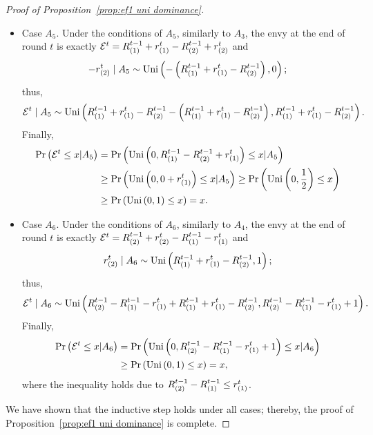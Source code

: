 \begin{proof}[Proof of Proposition~\ref{prop:ef1 uni dominance}]
\begin{itemize}
    \item Case $A_5$.
    Under the conditions of $A_5$, similarly to $A_3$, the envy at the end of round $t$ is exactly $\mathcal{E}^t = R^{t-1}_{(1)} + r_{(1)}^t - R^{t-1}_{(2)} + r_{(2)}^t$ and
    \[
    - r_{(2)}^t \mid A_5 \sim \text{Uni}\left(-\left(R^{t-1}_{(1)} + r_{(1)}^t - R^{t-1}_{(2)}\right), 0\right);
    \]
    thus,
    \[
    \mathcal{E}^t \mid A_5 \sim \text{Uni}\left(R^{t-1}_{(1)} + r_{(1)}^t -R^{t-1}_{(2)} -\left(R^{t-1}_{(1)} + r_{(1)}^t - R^{t-1}_{(2)}\right),  R^{t-1}_{(1)} + r_{(1)}^t -R^{t-1}_{(2)}\right).
    \]
    Finally,
    \begin{align*}
        \Pr\left( \mathcal{E}^t \leq x | A_5 \right) & = \Pr\left( \text{Uni}\left(0, R^{t-1}_{(1)} - R^{t-1}_{(2)}+ r_{(1)}^t\right) \leq x | A_5 \right)
        \\& \geq \Pr\left( \text{Uni}\left(0, 0 + r_{(1)}^t\right) \leq x | A_5 \right)
        \geq \Pr\left( \text{Uni}\left(0, \frac{1}{2}\right) \leq x \right) 
        \\& \geq \Pr\left( \text{Uni}\left(0, 1\right) \leq x \right) = x.
    \end{align*}

    \item Case $A_6$.
    Under the conditions of $A_6$, similarly to $A_4$, the envy at the end of round $t$ is exactly $\mathcal{E}^t = R^{t-1}_{(2)} + r_{(2)}^t - R^{t-1}_{(1)} - r_{(1)}^t$ and
    \[
    r_{(2)}^t \mid A_6 \sim \text{Uni}\left(R^{t-1}_{(1)}+r_{(1)}^t -R^{t-1}_{(2)}, 1\right);
    \]
    thus,
    \[
    \mathcal{E}^t \mid A_6 \sim \text{Uni}\left(R^{t-1}_{(2)} - R^{t-1}_{(1)} - r_{(1)}^t + R^{t-1}_{(1)}+r_{(1)}^t -R^{t-1}_{(2)}, R^{t-1}_{(2)} - R^{t-1}_{(1)} - r_{(1)}^t + 1\right).
    \]
    Finally,
    \begin{align*}
        \Pr\left( \mathcal{E}^t \leq x | A_6 \right) & = \Pr\left( \text{Uni}\left(0,R^{t-1}_{(2)} - R^{t-1}_{(1)} - r_{(1)}^t + 1\right) \leq x | A_6 \right)
        \\& \geq \Pr\left( \text{Uni}\left(0,1\right) \leq x \right) = x,
    \end{align*}
    where the inequality holds due to $R^{t-1}_{(2)} - R^{t-1}_{(1)} \leq r_{(1)}^t$.    
\end{itemize}
We have shown that the inductive step holds under all cases; thereby, the proof of Proposition~\ref{prop:ef1 uni dominance} is complete.
\end{proof}
